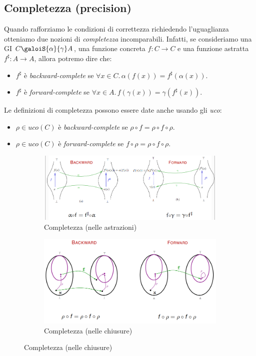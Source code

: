 \documentclass[a4paper,oneside,titlepage]{book}
\begin{document}
\subsection{Completezza (precision)}
Quando rafforziamo le condizioni di correttezza richiedendo l'uguaglianza otteniamo due nozioni di \textit{completezza} incomparabili. Infatti, se consideriamo una GI $C \galoiS{\alpha}{\gamma} A$, una funzione concreta $f: C \rightarrow C$ e una funzione astratta $f^{\sharp}: A \rightarrow A$, allora potremo dire che:
\begin{itemize}
	\item $f^{\sharp}$ è \textit{backward-complete} se $\forall x \in C. \, \alpha(f(x)) = f^{\sharp}(\alpha(x))$.
	\item $f^{\sharp}$ è \textit{forward-complete} se $\forall x \in A. \, f(\gamma(x)) = \gamma(f^{\sharp}(x))$.
\end{itemize}
Le definizioni di completezza possono essere date anche usando gli \textit{uco}:
\begin{itemize}
	\item $\rho \in uco(C)$ è \textit{backward-complete} se $\rho \circ f = \rho \circ f \circ \rho$.
	\item $\rho \in uco(C)$ è \textit{forward-complete} se $f \circ \rho = \rho \circ f \circ \rho$.
\end{itemize}
\begin{figure}[htp]
	\begin{subfigure}{0.49\textwidth}
	    \centering
		\includegraphics[width=\textwidth, height=\textheight, keepaspectratio]{complete1.png}
		\caption{Completezza (nelle astrazioni)}
	\end{subfigure}
	\hfill
	\begin{subfigure}{0.49\textwidth}
	    \centering
		\includegraphics[width=\textwidth, height=\textheight, keepaspectratio]{complete2.png} 
		\caption{Completezza (nelle chiusure)}
	\end{subfigure}
\end{figure}
\end{document}
